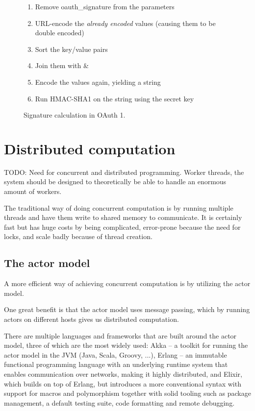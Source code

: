 \begin{figure}[h]
\begin{enumerate}[itemsep=0pt,topsep=0pt]
    \item Remove oauth\_signature from the parameters
    \item URL-encode the \textit{already encoded} values (causing them to be double encoded)
    \item Sort the key/value pairs
    \item Join them with \&
    \item Encode the values again, yielding a string
    \item Run HMAC-SHA1 on the string using the secret key
\end{enumerate}
\caption{Signature calculation in OAuth 1.}
\label{fig:oauth_signature_calculation}
\end{figure}

\section{Distributed computation}


TODO: Need for concurrent and distributed programming. Worker threads, the system should be designed to theoretically be able to handle an enormous amount of workers.

The traditional way of doing concurrent computation is by running multiple threads and have them write to shared memory to communicate. It is certainly fast but has huge costs by being complicated, error-prone because the need for locks, and scale badly because of thread creation. %


\subsection{The actor model}

A more efficient way of achieving concurrent computation is by utilizing the actor model. %

One great benefit is that the actor model uses message passing, which by running actors on different hosts gives us distributed computation.

There are multiple languages and frameworks that are built around the actor model, three of which are the most widely used: Akka -- a toolkit for running the actor model in the JVM (Java, Scala, Groovy, ...), Erlang -- an immutable functional programming language with an underlying runtime system that enables communication over networks, making it highly distributed, and Elixir, which builds on top of Erlang, but introduces a more conventional syntax with support for macros and polymorphism together with solid tooling such as package management, a default testing suite, code formatting and remote debugging.

